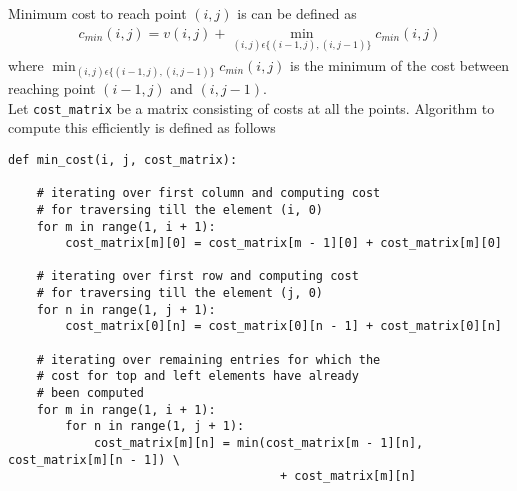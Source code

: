 \documentclass[12pt]{article}
\begin{document}
\begin{enumerate}[label=(\alph*)]
Minimum cost to reach point $(i, j)$ is can be defined as \\
\begin{align*}
c_{min}(i, j) = v(i, j) + \min_{(i, j) \epsilon \{(i-1, j), (i, j-1)\}}c_{min}(i, j)
\end{align*}
where $\min_{(i, j) \epsilon \{(i-1, j), (i, j-1)\}}c_{min}(i, j)$ is the minimum of the cost between reaching point $(i-1, j)$ and $(i, j-1)$. \\
Let \lstinline{cost_matrix} be a matrix consisting of costs at all the points. Algorithm to compute this efficiently is defined as follows\\
\begin{lstlisting}[basicstyle=\small]
def min_cost(i, j, cost_matrix):

    # iterating over first column and computing cost
    # for traversing till the element (i, 0)
    for m in range(1, i + 1):
        cost_matrix[m][0] = cost_matrix[m - 1][0] + cost_matrix[m][0]

    # iterating over first row and computing cost
    # for traversing till the element (j, 0)
    for n in range(1, j + 1):
        cost_matrix[0][n] = cost_matrix[0][n - 1] + cost_matrix[0][n]

    # iterating over remaining entries for which the
    # cost for top and left elements have already
    # been computed
    for m in range(1, i + 1):
        for n in range(1, j + 1):
            cost_matrix[m][n] = min(cost_matrix[m - 1][n], cost_matrix[m][n - 1]) \
                                      + cost_matrix[m][n]


\end{lstlisting}
\end{enumerate}
\end{document}
